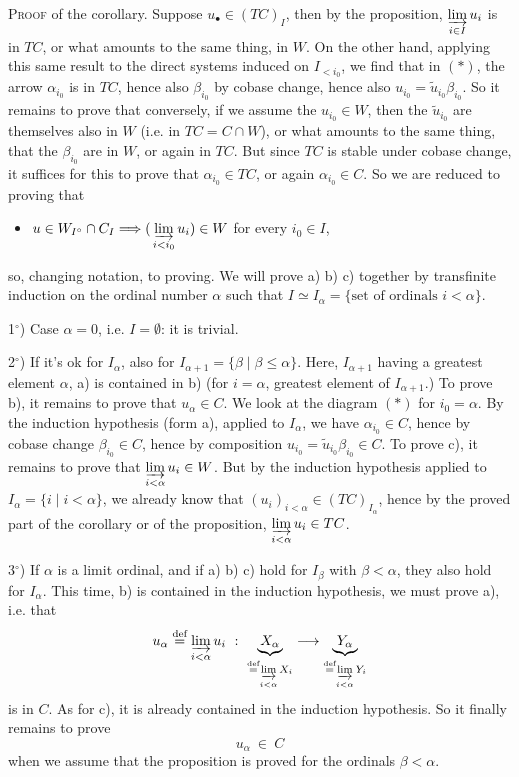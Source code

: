 \textsc{Proof} of the corollary. Suppose $u_\bullet \in (TC)_I$, then by the proposition, $\varinjlim\limits_{i\in I} u_i$ is in $TC$, or what amounts to the same thing, in $W$. On the other hand, applying this same result to the direct systems induced on $I_{<i_0}$, we find that in $(*)$, the arrow $\alpha_{i_0}$ is in $TC$, hence also $\beta_{i_0}$ by cobase change, hence also $u_{i_0} = \tilde{u}_{i_0}\beta_{i_0}$. So it remains to prove that conversely, if we assume the $u_{i_0} \in W$, then the $\tilde{u}_{i_0}$ are themselves also in $W$ (i.e. in $TC = C \cap W$), or what amounts to the same thing, that the $\beta_{i_0}$ are in $W$, or again in $TC$. But since $TC$ is stable under cobase change, it suffices for this to prove that $\alpha_{i_0} \in TC$, or again $\alpha_{i_0} \in C$. So we are reduced to proving that
\begin{itemize}[leftmargin=2.5em]
\item[c)] $u \in W_{I^{\circ}} \cap C_I \Longrightarrow (\,\varinjlim\limits_{i<i_0} u_i) \in W$ for every $i_0 \in I$,
\end{itemize}
so, changing notation, to proving. We will prove a) b) c) together by transfinite induction on the ordinal number $\alpha$ such that $I \simeq I_\alpha = \{\text{set of ordinals } i < \alpha\}$.


1$^\circ$) Case $\alpha = 0$, i.e. $I = \emptyset$: it is trivial.

2$^\circ$) If it's ok for $I_\alpha$, also for $I_{\alpha+1} = \{\beta \mid \beta \leq \alpha\}$. Here, $I_{\alpha+1}$ having a greatest element $\alpha$, a) is contained in b) (for $i = \alpha$, greatest element of $I_{\alpha+1}$.) To prove b), it remains to prove that $u_\alpha \in C$. We look at the diagram $(*)$ for $i_0 = \alpha$. By the induction hypothesis (form a), applied to $I_\alpha$, we have $\alpha_{i_0} \in C$, hence by cobase change $\beta_{i_0} \in C$, hence by composition $u_{i_0} = \tilde{u}_{i_0}\beta_{i_0} \in C$. To prove c), it remains to prove that $\varinjlim\limits_{i<\alpha} u_i \in W$. But by the induction hypothesis applied to $I_\alpha = \{i \mid i < \alpha\}$, we already know that $(u_i)_{i<\alpha} \in (TC)_{I_\alpha}$, hence by the proved part of the corollary or of the proposition, $\varinjlim\limits_{i<\alpha} u_i \in TC$.

3$^\circ$) If $\alpha$ is a limit ordinal, and if a) b) c) hold for $I_\beta$ with $\beta < \alpha$, they also hold for $I_\alpha$. This time, b) is contained in the induction
hypothesis, we must prove a), i.e. that
\[
u_\alpha \overset{\text{def}}{=} \varinjlim_{i<\alpha} u_i \ :\ \underbrace{X_\alpha}_{\overset{\text{def}}{=} \varinjlim\limits_{i<\alpha} X_i} \longrightarrow \underbrace{Y_\alpha}_{\overset{\text{def}}{=} \varinjlim\limits_{i<\alpha} Y_i}
\]
is in $C$. As for c), it is already contained in the induction hypothesis. So it finally remains to prove
\[
u_\alpha \ \in \ C
\]
when we assume that the proposition is proved for the ordinals $\beta < \alpha$.

